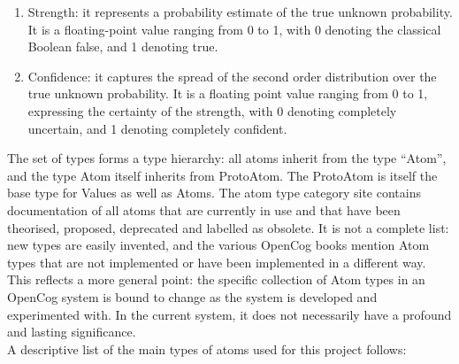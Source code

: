 \begin{enumerate}
	\item Strength: it represents a probability estimate of the true unknown probability. It is a floating-point value ranging from 0 to 1, with 0 denoting the classical Boolean false, and 1 denoting true.
	\item Confidence: it captures the spread of the second order distribution over the true unknown probability. It is a floating point value ranging from 0 to 1, expressing the certainty of the strength, with 0 denoting completely uncertain, and 1 denoting completely confident.
\end{enumerate}

The set of types forms a type hierarchy: all atoms inherit from the type \enquote{Atom}, and the type Atom itself inherits from ProtoAtom. The ProtoAtom is itself the base type for Values as well as Atoms.
The atom type category site\footnotemark{} contains documentation of all atoms that are currently in use and that have been theorised, proposed, deprecated and labelled as obsolete.
It is not a complete list: new types are easily invented, and the various OpenCog books mention Atom types that are not implemented or have been implemented in a different way. This reflects a more general point: the specific collection of Atom types in an OpenCog system is bound to change as the system is developed and experimented with. In the current system, it does not necessarily have a profound and lasting significance. \\

A descriptive list of the main types of atoms used for this project follows:

